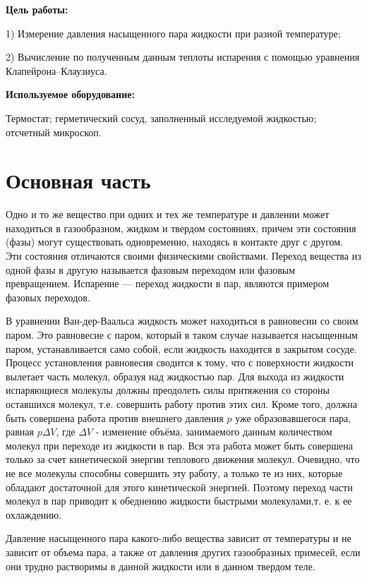 \documentclass[a4paper,10pt]{article} %
\begin{document}
\textbf{Цель работы:}

1) Измерение давления насыщенного пара жидкости при разной температуре; 

2) Вычисление по полученным данным
теплоты испарения с помощью уравнения Клапейрона–Клаузиуса.

\textbf{Используемое оборудование:}

Термостат; герметический сосуд, заполненный исследуемой жидкостью; отсчетный микроскоп.

\section{Основная часть}

Одно и то же вещество при одних и тех же температуре и давлении может находиться в газообразном, жидком и 
твердом состояниях, причем эти состояния (фазы) могут существовать одновременно, находясь в контакте друг с другом.
 Эти состояния отличаются своими физическими свойствами. Переход вещества из одной фазы в другую называется 
 фазовым переходом или фазовым превращением. Испарение — переход жидкости в пар, являются примером фазовых переходов. 

В уравнении Ван-дер-Ваальса жидкость может находиться в равновесии со своим паром. Это равновесие с паром, 
который в таком случае называется насыщенным паром, устанавливается само собой, если жидкость находится в 
закрытом сосуде. Процесс установления равновесия сводится к тому, что с поверхности жидкости вылетает часть 
молекул, образуя над жидкостью пар. Для выхода из жидкости испаряющиеся молекулы должны преодолеть силы притяжения 
со стороны оставшихся молекул, т.е. совершить работу против этих сил. Кроме того, должна быть совершена работа 
против внешнего давления $p$ уже образовавшегося пара, равная $p \Delta V$, где $\Delta V$ - изменение объёма,
занимаемого данным количеством молекул при переходе из жидкости в пар. Вся эта работа может быть совершена 
только за счет кинетической энергии теплового движения молекул. Очевидно, что не все молекулы способны совершить 
эту работу, а только те из них, которые обладают достаточной для этого кинетической энергией. Поэтому переход 
части молекул в пар приводит к обеднению жидкости быстрыми молекулами,т. е. к ее охлаждению.

Давление насыщенного пара какого-либо вещества зависит от температуры и не зависит от объема пара, а также 
от давления других газообразных примесей, если они трудно растворимы в данной жидкости или в данном твердом теле.
\end{document}
